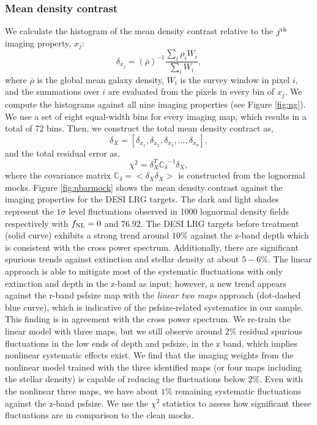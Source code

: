 \subsubsection{Mean density contrast}
We calculate the histogram of the mean density contrast relative to the $j^{\rm th}$ imaging property, $x_{j}$:
\begin{equation}
\delta_{x_{j}} = ({\overline{\rho}})^{-1} \frac{\sum_{i} \rho_{i} W_{i}}{\sum_{i} W_{i}},
\end{equation}
where $\overline{\rho}$ is the global mean galaxy density, $W_{i}$ is the survey window in pixel $i$, and the summations over $i$ are evaluated from the pixels in every bin of $x_{j}$. We compute the histograms against all nine imaging properties (see Figure \ref{fig:ng}). We use a set of eight equal-width bins for every imaging map, which results in a total of 72 bins. Then, we construct the total mean density contract as,
\begin{equation}
\delta_{X} = [\delta_{x_{1}}, \delta_{x_{2}}, \delta_{x_{3}}, ..., \delta_{x_{9}}],
\end{equation}
and the total residual error as,
\begin{equation}
\chi^{2} = \delta_{X}^{T} \mathbb{C_{\delta}}^{-1} \delta_{X},
\end{equation}
where the covariance matrix $\mathbb{C}_{\delta} = < \delta_{X} \delta_{X}>$ is constructed from the lognormal mocks. Figure \ref{fig:nbarmock} shows the mean density contrast against the imaging properties for the DESI LRG targets. The dark and light shades represent the $1\sigma$ level fluctuations observed in 1000 lognormal density fields respectively with $f_{\rm NL}=0$ and $76.92$. The DESI LRG targets before treatment (solid curve) exhibits a strong trend around $10\%$ against the z-band depth which is consistent with the cross power spectrum. Additionally, there are significant spurious trends against extinction and stellar density at about $5-6\%$. The linear approach is able to mitigate most of the systematic fluctuations with only extinction and depth in the z-band as input; however,  a new trend appears against the r-band psfsize map with the \textit{linear two maps} approach (dot-dashed blue curve), which is indicative of the psfsize-related systematics in our sample. This finding is in agreement with the cross power spectrum. We re-train the linear model with three maps, but we still observe around $2\%$ residual spurious fluctuations in the low ends of depth and psfsize, in the z band, which implies nonlinear systematic effects exist. We find that the imaging weights from the nonlinear model trained with the three identified maps (or four maps including the stellar density) is capable of reducing the fluctuations below $2\%$. Even with the nonlinear three maps, we have about $1\%$ remaining systematic fluctuations against the z-band psfsize. We use the $\chi^{2}$ statistics to assess how significant these fluctuations are in comparison to the clean mocks. 

